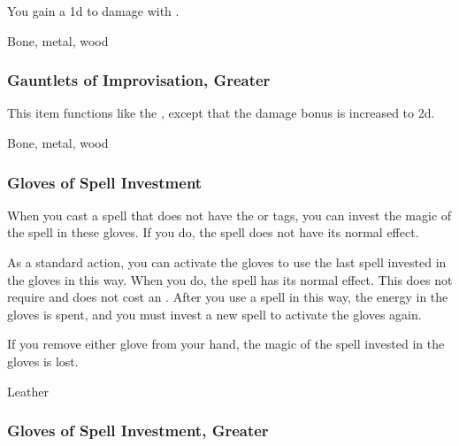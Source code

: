 You gain a \plus1d  to damage with .



 Bone, metal, wood


\lowercase{\hypertarget{item:Gauntlets of Improvisation, Greater}{}}\label{item:Gauntlets of Improvisation, Greater}
\hypertarget{item:Gauntlets of Improvisation, Greater}{\subsubsection{Gauntlets of Improvisation, Greater\hfill{}}}

This item functions like the , except that the damage bonus is increased to \plus2d.



 Bone, metal, wood


\lowercase{\hypertarget{item:Gloves of Spell Investment}{}}\label{item:Gloves of Spell Investment}
\hypertarget{item:Gloves of Spell Investment}{\subsubsection{Gloves of Spell Investment\hfill{}}}

When you cast a spell that does not have the  or  tags,
you can invest the magic of the spell in these gloves.
If you do, the spell does not have its normal effect.

As a standard action, you can activate the gloves to use the last spell invested in the gloves in this way.
When you do, the spell has its normal effect.
This does not require  and does not cost an .
After you use a spell in this way, the energy in the gloves is spent, and you must invest a new spell to activate the gloves again.

If you remove either glove from your hand, the magic of the spell invested in the gloves is lost.



 


 Leather


\lowercase{\hypertarget{item:Gloves of Spell Investment, Greater}{}}\label{item:Gloves of Spell Investment, Greater}
\hypertarget{item:Gloves of Spell Investment, Greater}{\subsubsection{Gloves of Spell Investment, Greater\hfill{}}}

